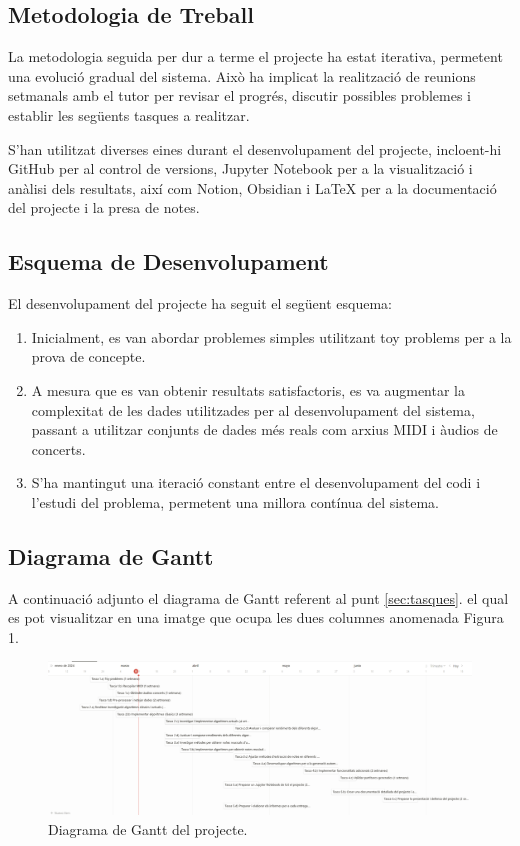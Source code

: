 \documentclass[10pt,a4paper,twocolumn,twoside]{article}
\begin{document}
\subsection{Metodologia de Treball}
\label{subsec-metodologia}

La metodologia seguida per dur a terme el projecte ha estat iterativa, permetent una evolució gradual del sistema. Això ha implicat la realització de reunions setmanals amb el tutor per revisar el progrés, discutir possibles problemes i establir les següents tasques a realitzar.

S'han utilitzat diverses eines durant el desenvolupament del projecte, incloent-hi GitHub per al control de versions, Jupyter Notebook per a la visualització i anàlisi dels resultats, així com Notion, Obsidian i LaTeX per a la documentació del projecte i la presa de notes.

\subsection{Esquema de Desenvolupament}
\label{subsec-esquema-desenvolupament}

El desenvolupament del projecte ha seguit el següent esquema:

\begin{enumerate}
    \item Inicialment, es van abordar problemes simples utilitzant toy problems per a la prova de concepte.
    \item A mesura que es van obtenir resultats satisfactoris, es va augmentar la complexitat de les dades utilitzades per al desenvolupament del sistema, passant a utilitzar conjunts de dades més reals com arxius MIDI i àudios de concerts.
    \item S'ha mantingut una iteració constant entre el desenvolupament del codi i l'estudi del problema, permetent una millora contínua del sistema.
\end{enumerate}

\subsection{Diagrama de Gantt}
\label{subsec-diagrama-de-Gantt}

A continuació adjunto el diagrama de Gantt referent al punt \ref{sec:tasques}. el qual es pot visualitzar en una imatge que ocupa les dues columnes anomenada Figura 1.
\begin{figure}
    \centering
    \includegraphics[width=\textwidth]{img/Diagrama de Gantt Claro Fecha.png}
    \caption{Diagrama de Gantt del projecte.}
    \label{fig:gantt}
\end{figure}
\end{document}
